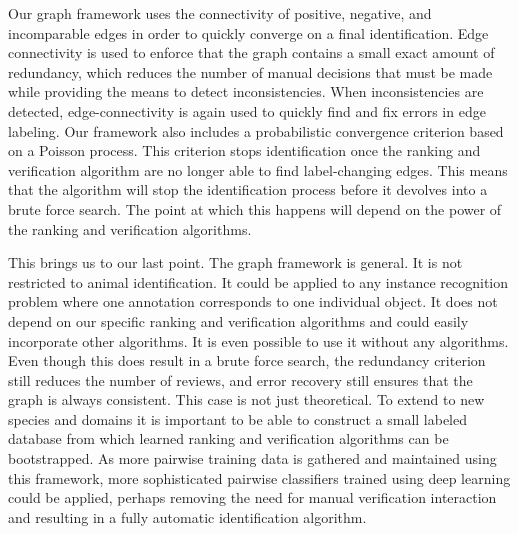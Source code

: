 

Our graph framework uses the connectivity of positive, negative, and incomparable edges in order to quickly
  converge on a final identification.
Edge connectivity is used to enforce that the graph contains a small exact amount of redundancy, which reduces
  the number of manual decisions that must be made while providing the means to detect inconsistencies.
When inconsistencies are detected, edge-connectivity is again used to quickly find and fix errors in edge
  labeling.
Our framework also includes a probabilistic convergence criterion based on a Poisson process.
This criterion stops identification once the ranking and verification algorithm are no longer able to find
  label-changing edges.
This means that the algorithm will stop the identification process before it devolves into a brute force search.
The point at which this happens will depend on the power of the ranking and verification algorithms.

This brings us to our last point.
The graph framework is general.
It is not restricted to animal identification.
It could be applied to any instance recognition problem where one annotation corresponds to one individual
  object.
It does not depend on our specific ranking and verification algorithms and could easily incorporate other
  algorithms.
It is even possible to use it without any algorithms.
Even though this does result in a brute force search, the redundancy criterion still reduces the number of
  reviews, and error recovery still ensures that the graph is always consistent.
This case is not just theoretical.
To extend to new species and domains it is important to be able to construct a small labeled database from which
  learned ranking and verification algorithms can be bootstrapped.
As more pairwise training data is gathered and maintained using this framework, more sophisticated pairwise
  classifiers trained using deep learning could be applied, perhaps removing the need for manual verification
  interaction and resulting in a fully automatic identification algorithm.

